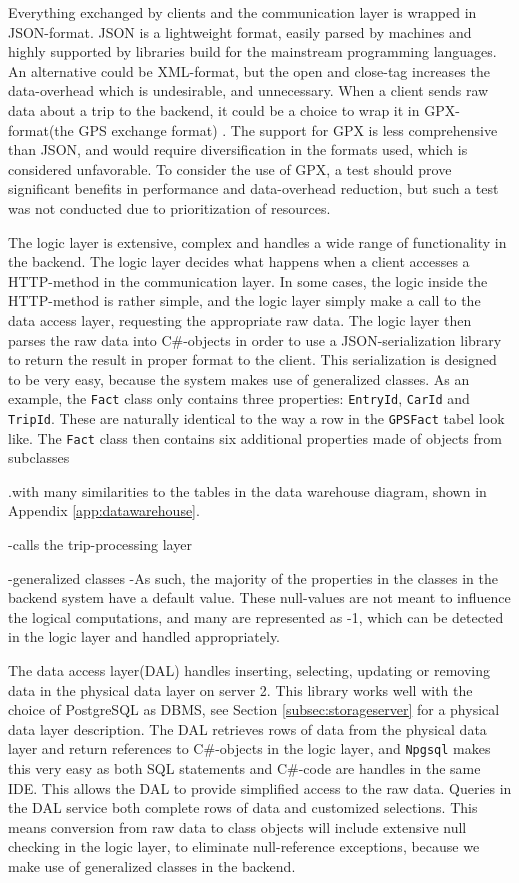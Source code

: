 Everything exchanged by clients and the communication layer is wrapped in JSON-format. JSON is a lightweight format, easily parsed by machines and highly supported by libraries build for the mainstream programming languages. An alternative could be XML-format, but the open and close-tag increases the data-overhead which is undesirable, and unnecessary. When a client sends raw data about a trip to the backend, it could be a choice to wrap it in GPX-format(the GPS exchange format) \citep{GPX_format}. The support for GPX is less comprehensive than JSON, and would require diversification in the formats used, which is considered unfavorable. To consider the use of GPX, a test should prove significant benefits in performance and data-overhead reduction, but such a test was not conducted due to prioritization of resources. 

The logic layer is extensive, complex and handles a wide range of functionality in the backend. The logic layer decides what happens when a client accesses a HTTP-method in the communication layer. In some cases, the logic inside the HTTP-method is rather simple, and the logic layer simply make a call to the data access layer, requesting the appropriate raw data. The logic layer then parses the raw data into C\#-objects in order to use a JSON-serialization library to return the result in proper format to the client. This serialization is designed to be very easy, because the system makes use of generalized classes. As an example, the \texttt{Fact} class  only contains three properties: \texttt{EntryId}, \texttt{CarId} and \texttt{TripId}. These are naturally identical to the way a row in the \texttt{GPSFact} tabel look like. The \texttt{Fact} class then contains six additional properties made of objects from subclasses

.with many similarities to the tables in the data warehouse diagram, shown in Appendix \ref{app:datawarehouse}. 

-calls the trip-processing layer

-generalized classes
-As such, the majority of the properties in the classes in the backend system have a default value. These null-values are not meant to influence the logical computations, and many are represented as -1, which can be detected in the logic layer and handled appropriately.



The data access layer(DAL) handles inserting, selecting, updating or removing data in the physical data layer on server 2. This library works well with the choice of PostgreSQL as DBMS, see Section \ref{subsec:storageserver} for a physical data layer description. The DAL retrieves rows of data from the physical data layer and return references to C\#-objects in the logic layer, and \texttt{Npgsql} makes this very easy as both SQL statements and C\#-code are handles in the same IDE. This allows the DAL to provide simplified access to the raw data. Queries in the DAL service both complete rows of data and customized selections. This means conversion from raw data to class objects will include extensive null checking in the logic layer, to eliminate null-reference exceptions, because we make use of generalized classes in the backend. 

